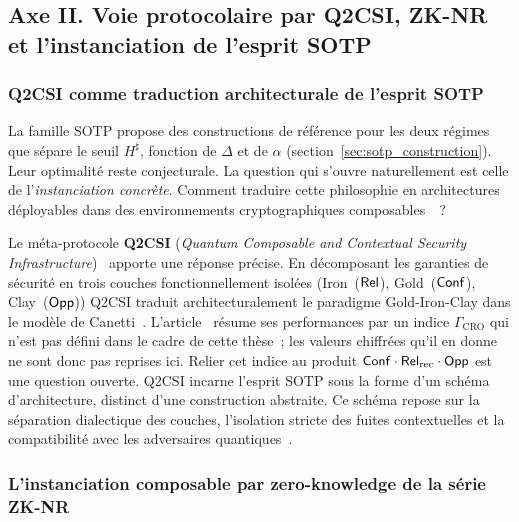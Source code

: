 \subsection{Axe II. Voie protocolaire par Q2CSI, ZK-NR et l'instanciation de l'esprit SOTP}
\label{subsec:axe2_q2csi_zknr}
\begin{sloppypar}

\subsubsection{Q2CSI comme traduction architecturale de l'esprit SOTP}
\label{subsubsec:q2csi}

La famille SOTP propose des constructions de r\'ef\'erence pour les deux r\'egimes que s\'epare
le seuil $H^\sharp$, fonction de $\Delta$ et de $\alpha$ (section~\ref{sec:sotp_construction}). Leur
optimalit\'e reste conjecturale. La question qui
s'ouvre naturellement est celle de l'\emph{instanciation concr\`ete}. Comment
traduire cette philosophie en architectures d\'eployables dans des
environnements cryptographiques composables~\cite{Canetti01,Canetti2000}~?

Le m\'eta-protocole \textbf{Q2CSI} (\textit{Quantum Composable and Contextual
Security Infrastructure})~\cite{MINKA2025Q2CSI} apporte une r\'eponse
pr\'ecise. En d\'ecomposant les garanties de s\'ecurit\'e en trois couches
fonctionnellement isol\'ees (Iron~($\mathsf{Rel}$), Gold~($\mathsf{Conf}$),
Clay~($\mathsf{Opp}$)) Q2CSI traduit architecturalement le paradigme
Gold-Iron-Clay dans le mod\`ele de Canetti~\cite{Canetti01,Canetti2000}.
L'article~\cite{MINKA2025Q2CSI} r\'esume ses performances par un indice
$\Gamma_\text{CRO}$ qui n'est pas d\'efini dans le cadre de cette th\`ese~; les
valeurs chiffr\'ees qu'il en donne ne sont donc pas reprises ici. Relier
cet indice au produit $\mathsf{Conf}\cdot\mathsf{Rel}_{\mathrm{rec}}\cdot\mathsf{Opp}$ est une question ouverte. Q2CSI incarne
l'esprit SOTP sous la forme d'un sch\'ema d'architecture, distinct d'une
construction abstraite. Ce sch\'ema repose sur la s\'eparation dialectique des couches, l'isolation stricte des
fuites contextuelles et la compatibilit\'e avec les adversaires
quantiques~\cite{Unruh2010,Unruh2015}.

\subsubsection{L'instanciation composable par zero-knowledge de la s\'erie ZK-NR}
\label{subsubsec:zk_nr}


\end{sloppypar}
